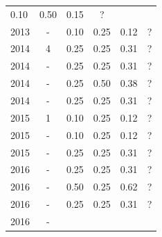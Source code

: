 \begin{table}[H]
\begin{tabular}{| l | c | c | c | c | c |}
          0.10
          &
          0.50
          &
            {\color{red} 0.15}
          &
          ?
          \\
            2013
          &
          -
          &
          0.10
          &
          0.25
          &
            {\color{red} 0.12}
          &
          ?
          \\
\hline
            2014
          &
          4
          &
          0.25
          &
          0.25
          &
            {\color{red} 0.31}
          &
          ?
          \\
            2014
          &
          -
          &
          0.25
          &
          0.25
          &
            {\color{red} 0.31}
          &
          ?
          \\
            2014
          &
          -
          &
          0.25
          &
          0.50
          &
            {\color{red} 0.38}
          &
          ?
          \\
            2014
          &
          -
          &
          0.25
          &
          0.25
          &
            {\color{red} 0.31}
          &
          ?
          \\
\hline
            2015
          &
          1
          &
          0.10
          &
          0.25
          &
            {\color{red} 0.12}
          &
          ?
          \\
            2015
          &
          -
          &
          0.10
          &
          0.25
          &
            {\color{red} 0.12}
          &
          ?
          \\
            2015
          &
          -
          &
          0.25
          &
          0.25
          &
            {\color{red} 0.31}
          &
          ?
          \\
\hline
            2016
          &
          -
          &
          0.25
          &
          0.25
          &
            {\color{red} 0.31}
          &
          ?
          \\
            2016
          &
          -
          &
          0.50
          &
          0.25
          &
            {\color{blue} 0.62}
          &
          ?
          \\
            2016
          &
          -
          &
          0.25
          &
          0.25
          &
            {\color{red} 0.31}
          &
          ?
          \\
            2016
          &
          -
          &

\end{tabular}
\end{table}
